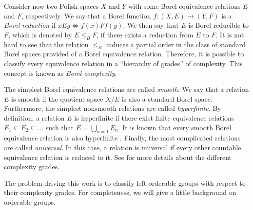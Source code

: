 \documentclass[12pt]{article}
\theoremstyle{definition}
\begin{document}


Consider now two Polish spaces $X$ and $Y$ with some Borel equivalence relations $E$ and $F$, respectively. We say that a Borel function $f:(X,E)\rightarrow (Y,F)$ is a {\it Borel reduction} if $xEy\Longleftrightarrow  f(x)F f(y)$. We then say that $E$ is Borel reducible to $F$, which is denoted by $E\leq_B F$, if there exists a reduction from $E$ to $F$. It is not hard to see that the relation $\leq_B$ induces a partial order in the class of standard Borel spaces provided of a Borel equivalence relation.
Therefore, it is possible to classify every equivalence relation in a ``hierarchy of grades'' of complexity. This concept is known as {\it Borel complexity}. 

The simplest Borel equivalence relations are called \textit{smooth}. We say that a relation $E$ is smooth if the quotient space $X/E$ is also a standard Borel space. Furthermore, the simplest nonsmooth relations are called \textit{hyperfinite}. By definition, a relation $E$ is hyperfinite if there exist finite equivalence relations $E_1\subseteq E_2 \subseteq \dots$ such that $E=\bigcup_{n=1}E_n$.
It is known that every smooth Borel equivalence relation is also hyperfinite \cite{NKechris}. Finally, the most complicated relations are called \textit{universal}. In this case, a relation is universal if every other countable equivalence relation is reduced to it. 
See \cite[Chapter 6]{NKechris} for more details about the different complexity grades.

The problem driving this work is to classify left-orderable groups with respect to their complexity grades. For completeness, we will give a little background on orderable groups.
\end{document}
